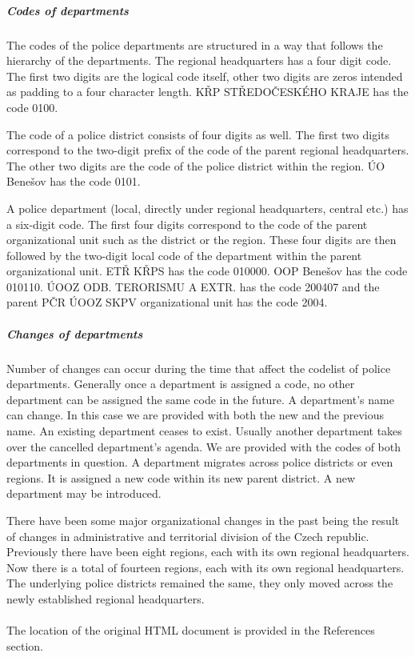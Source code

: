 \subparagraph{Codes of departments}
The codes of the police departments are structured in a way that follows the hierarchy of the departments.
The regional headquarters has a four digit code. The first two digits are the logical code itself, other two digits are zeros intended as padding to a four character length.
KŘP STŘEDOČESKÉHO KRAJE has the code 0100.

The code of a police district consists of four digits as well. The first two digits correspond to the two-digit prefix of the code of the parent regional headquarters. The other two digits are the code of the police district within the region.
ÚO Benešov has the code 0101.

A police department (local, directly under regional headquarters, central etc.) has a six-digit code.
The first four digits correspond to the code of the parent organizational unit such as the district or the region. These four digits are then followed by the two-digit local code of the department within the parent organizational unit.
ETŘ KŘPS has the code 010000.
OOP Benešov has the code 010110.
ÚOOZ ODB. TERORISMU A EXTR. has the code 200407 and the parent PČR ÚOOZ SKPV organizational unit has the code 2004.

\subparagraph{Changes of departments}
Number of changes can occur during the time that affect the codelist of police departments.
Generally once a department is assigned a code, no other department can be assigned the same code in the future.
A department's name can change. In this case we are provided with both the new and the previous name.
An existing department ceases to exist. Usually another department takes over the cancelled department's agenda. We are provided with the codes of both departments in question.
A department migrates across police districts or even regions. It is assigned a new code within its new parent district.
A new department may be introduced.

There have been some major organizational changes in the past being the result of changes in administrative and territorial division of the Czech republic. Previously there have been eight regions, each with its own regional headquarters. Now there is a total of fourteen regions, each with its own regional headquarters.
The underlying police districts remained the same, they only moved across the newly established regional headquarters.

\paragraph{} The location of the original HTML document is provided in the References section.

